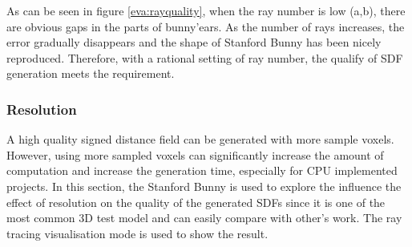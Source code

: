 As can be seen in figure \ref{eva:rayquality}, when the ray number is low (a,b), there are obvious gaps in the parts of bunny'ears. As the number of rays increases, the error gradually disappears and the shape of Stanford Bunny has been nicely reproduced. Therefore, with a rational setting of ray number, the qualify of SDF generation meets the requirement.

\clearpage

\subsubsection{Resolution}

A high quality signed distance field can be generated with more sample voxels. However, using more sampled voxels can significantly increase the amount of computation and increase the generation time, especially for CPU implemented projects. In this section, the Stanford Bunny is used to explore the influence the effect of resolution on the quality of the generated SDFs since it is one of the most common 3D test model and can easily compare with other's work. The ray tracing visualisation mode is used to show the result.

